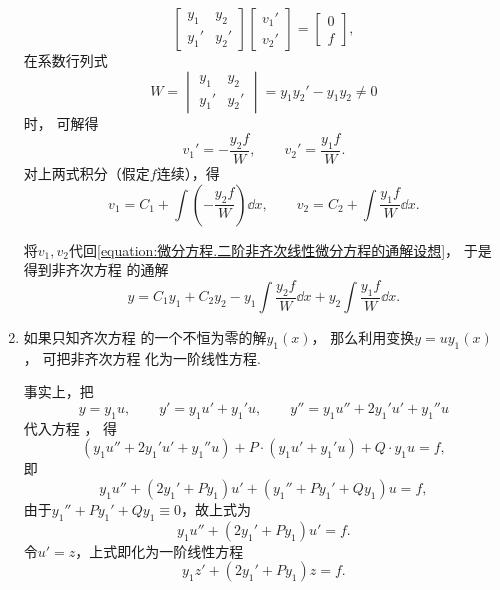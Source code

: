 \begin{enumerate}
\[\begin{bmatrix}
			y_1 & y_2 \\
			y_1' & y_2'
		\end{bmatrix}
		\begin{bmatrix}
			v_1' \\ v_2'
		\end{bmatrix}
		= \begin{bmatrix}
			0 \\ f
		\end{bmatrix},
	\]
	在系数行列式\[
		W = \begin{vmatrix} y_1 & y_2 \\ y_1' & y_2' \end{vmatrix}
		= y_1 y_2' - y_1 y_2 \neq0
	\]时，
	可解得\[
		v_1' = -\frac{y_2 f}{W},
		\qquad
		v_2' = \frac{y_1 f}{W}.
	\]
	对上两式积分（假定\(f\)连续），得\[
		v_1 = C_1 + \int \left(-\frac{y_2 f}{W}\right) \dd{x},
		\qquad
		v_2 = C_2 + \int \frac{y_1 f}{W} \dd{x}.
	\]

	将\(v_1,v_2\)代回\cref{equation:微分方程.二阶非齐次线性微分方程的通解设想}，
	于是得到非齐次方程  的通解
	\begin{equation}\label{equation:微分方程.二阶非齐次线性微分方程的通解.形式1}
		y = C_1 y_1 + C_2 y_2
		- y_1 \int \frac{y_2 f}{W} \dd{x}
		+ y_2 \int \frac{y_1 f}{W} \dd{x}.
	\end{equation}

	\item%
	如果只知齐次方程 
	的一个不恒为零的解\(y_1(x)\)，
	那么利用变换\(y = u y_1(x)\)，
	可把非齐次方程 
	化为一阶线性方程.

	事实上，把\[
		y = y_1 u, \qquad y' = y_1 u' + y_1' u, \qquad y'' = y_1 u'' + 2 y_1' u' + y_1'' u
	\]
	代入方程 ，
	得\[
		(y_1 u'' + 2y_1' u' + y_1'' u) + P\cdot(y_1 u' + y_1' u) + Q \cdot y_1 u = f,
	\]
	即\[
		y_1 u'' + (2y_1' + P y_1) u' + (y_1'' + P y_1' + Q y_1) u = f,
	\]
	由于\(y_1'' + P y_1' + Q y_1 \equiv 0\)，故上式为\[
		y_1 u'' + (2 y_1' + P y_1) u' = f.
	\]
	令\(u' = z\)，上式即化为一阶线性方程
	\begin{equation}\label{equation:微分方程.降为一阶的二阶线性微分方程}
		y_1 z' + (2 y_1' + P y_1) z = f.
	\end{equation}


\end{enumerate}
